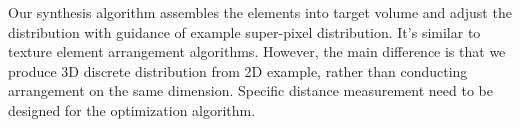 Our synthesis algorithm assembles the elements into target volume and adjust the distribution with guidance of example super-pixel distribution. It's similar to texture element arrangement algorithms. However, the main difference is that we produce 3D discrete distribution from 2D example, rather than conducting arrangement on the same dimension. Specific distance measurement need to be designed for the optimization algorithm. 